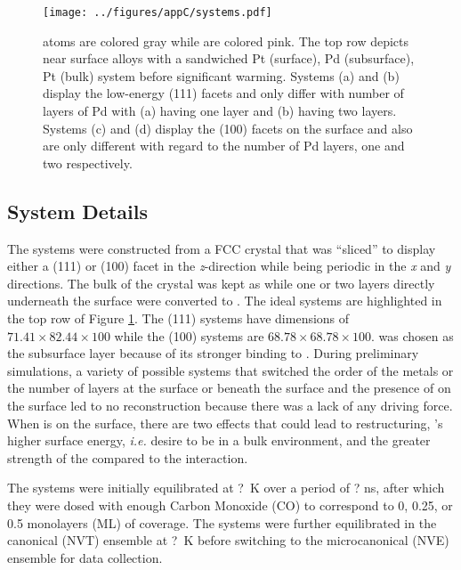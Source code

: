 \begin{landscape}
\begin{figure}[p!]
\centering
  \texttt{[image: ../figures/appC/systems.pdf]}
  \caption{ atoms are colored gray while  are colored pink. The
top row depicts near surface alloys with a sandwiched Pt (surface), Pd
(subsurface), Pt (bulk) system before significant warming. Systems (a) and (b)
display the low-energy (111) facets and only differ with number of layers of Pd
with (a) having one layer and (b) having two layers. Systems (c) and (d)
display the (100) facets on the surface and also are only different with regard
to the number of Pd layers, one and two respectively.}
\label{fig:biSystems}
\end{figure}
\end{landscape}

\subsection{System Details}
The systems were constructed from a FCC  crystal that was ``sliced'' to
display either a (111) or (100) facet in the {\em z}-direction while being
periodic in the {\em x} and {\em y} directions. The bulk of the crystal was
kept as  while one or two layers directly underneath the surface were
converted to . The ideal systems are highlighted in the top row of
Figure \ref{fig:biSystems}. The (111) systems have dimensions of
$71.41\times82.44\times100$ while the (100) systems are
$68.78\times68.78\times100$.  was chosen as the subsurface layer because
of its stronger binding to . During preliminary simulations, a variety
of possible systems that switched the order of the metals or the number of
layers at the surface or beneath the surface and the presence of  on the
surface led to no reconstruction because there was a lack of any driving force.
When  is on the surface, there are two effects that could lead to
restructuring, 's higher surface energy, {\em i.e.} desire to be in a
bulk environment, and the greater strength of the  compared to
the  interaction.

The systems were initially equilibrated at ?~K over a period of ? ns, after
which they were dosed with enough Carbon Monoxide (CO) to correspond to 0,
0.25, or 0.5 monolayers (ML) of coverage. The systems were further equilibrated
in the canonical (NVT) ensemble at ?~K before switching to the microcanonical
(NVE) ensemble for data collection. 

